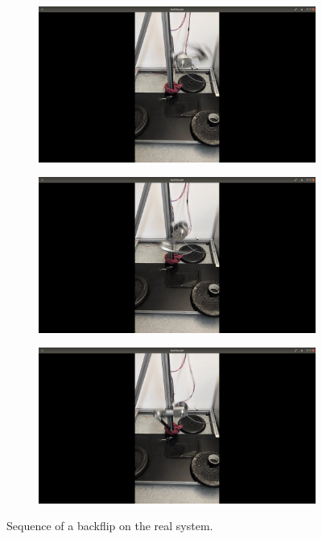 \documentclass[onecolumn, letter paper]{report}
\begin{document}
\begin{figure}[htb!]
\begin{subfigure}{.16\textwidth}
    \end{subfigure}
    \begin{subfigure}{.16\textwidth}
    \includegraphics[width=\textwidth, trim={27cm 10cm 27cm 5cm}, clip]{figures/backflip/b4.png}
    \end{subfigure}
    \begin{subfigure}{.16\textwidth}
    \includegraphics[width=\textwidth, trim={27cm 10cm 27cm 5cm}, clip]{figures/backflip/b5.png}
    \end{subfigure}
    \begin{subfigure}{.16\textwidth}
    \includegraphics[width=\textwidth, trim={27cm 10cm 27cm 5cm}, clip]{figures/backflip/b6.png}
    \end{subfigure}
    \caption{Sequence of a backflip on the real system.}
    \label{fig:flip}
\end{figure}


\clearpage

\printbibliography
\end{document}
